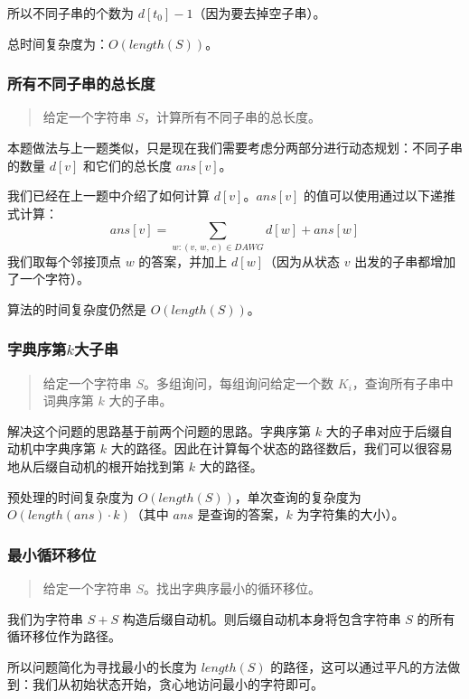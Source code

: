 所以不同子串的个数为 \(d[t_0]-1\)（因为要去掉空子串）。

总时间复杂度为：\(O(length(S))\)。

\subsubsection{所有不同子串的总长度}

\begin{quote}
给定一个字符串 \(S\)，计算所有不同子串的总长度。
\end{quote}

本题做法与上一题类似，只是现在我们需要考虑分两部分进行动态规划：不同子串的数量
\(d[v]\) 和它们的总长度 \(ans[v]\)。

我们已经在上一题中介绍了如何计算 \(d[v]\)。\(ans[v]\)
的值可以使用通过以下递推式计算：
\[
ans[v]=\sum_{w:(v,\,w,\,c)\in DAWG}d[w]+ans[w]
\]
我们取每个邻接顶点 \(w\) 的答案，并加上 \(d[w]\)（因为从状态 \(v\)
出发的子串都增加了一个字符）。

算法的时间复杂度仍然是 \(O(length(S))\)。

\subsubsection{字典序第$k$大子串}

\begin{quote}
给定一个字符串 \(S\)。多组询问，每组询问给定一个数
\(K_i\)，查询所有子串中词典序第 \(k\) 大的子串。
\end{quote}

解决这个问题的思路基于前两个问题的思路。字典序第 \(k\)
大的子串对应于后缀自动机中字典序第 \(k\)
大的路径。因此在计算每个状态的路径数后，我们可以很容易地从后缀自动机的根开始找到第
\(k\) 大的路径。

预处理的时间复杂度为 \(O(length(S))\)，单次查询的复杂度为
\(O(length(ans)\cdot k)\)（其中 \(ans\) 是查询的答案，\(k\)
为字符集的大小）。

\subsubsection{最小循环移位}

\begin{quote}
给定一个字符串 \(S\)。找出字典序最小的循环移位。
\end{quote}

我们为字符串 \(S+S\) 构造后缀自动机。则后缀自动机本身将包含字符串 \(S\)
的所有循环移位作为路径。

所以问题简化为寻找最小的长度为 \(length(S)\)
的路径，这可以通过平凡的方法做到：我们从初始状态开始，贪心地访问最小的字符即可。

